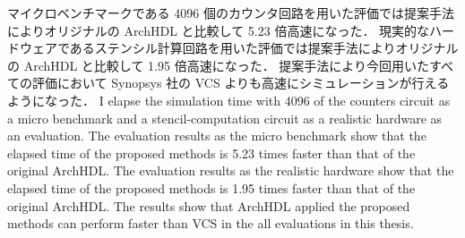 マイクロベンチマークである 4096 個のカウンタ回路を用いた評価では提案手法によりオリジナルの ArchHDL と比較して 5.23 倍高速になった．
現実的なハードウェアであるステンシル計算回路を用いた評価では提案手法によりオリジナルの ArchHDL と比較して 1.95 倍高速になった．
提案手法により今回用いたすべての評価において Synopsys 社の VCS よりも高速にシミュレーションが行えるようになった．
\fi
I elapse the simulation time with 4096 of the counters circuit as a micro benchmark and a stencil-computation circuit as a realistic hardware as an evaluation.
The evaluation results as the micro benchmark show that the elapsed time of the proposed methods is 5.23 times faster than that of the original ArchHDL.
The evaluation results as the realistic hardware show that the elapsed time of the proposed methods is 1.95 times faster than that of the original ArchHDL.
The results show that ArchHDL applied the proposed methods can perform faster than VCS in the all evaluations in this thesis.
